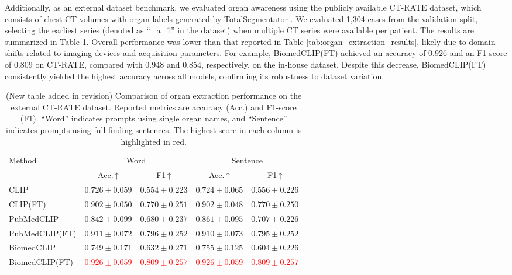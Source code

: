 \documentclass[bioengineering,article,submit,pdftex,moreauthors]{Definitions/mdpi}
\begin{document}
Additionally, as an external dataset benchmark, we evaluated organ awareness using the publicly available CT-RATE dataset, which consists of chest CT volumes with organ labels generated by TotalSegmentator \cite{hamamci_ct2rep_2024}. 
We evaluated 1,304 cases from the validation split, selecting the earliest series (denoted as “\_a\_1” in the dataset) when multiple CT series were available per patient. 
The results are summarized in Table \ref{tab:organ_extraction_results_ctrate}. 
Overall performance was lower than that reported in Table \ref{tab:organ_extraction_results}, likely due to domain shifts related to imaging devices and acquisition parameters. 
For example, BiomedCLIP(FT) achieved an accuracy of 0.926 and an F1-score of 0.809 on CT-RATE, compared with 0.948 and 0.854, respectively, on the in-house dataset. 
Despite this decrease, BiomedCLIP(FT) consistently yielded the highest accuracy across all models, confirming its robustness to dataset variation.



\begin{table}[ht]
  \centering
  \caption{(New table added in revision) Comparison of organ extraction performance on the external CT-RATE dataset. 
  Reported metrics are accuracy (Acc.) and F1-score (F1). 
  “Word” indicates prompts using single organ names, and “Sentence” indicates prompts using full finding sentences. 
  The highest score in each column is highlighted in red.}
  \label{tab:organ_extraction_results_ctrate}
  \begin{tabular}{lcccc}
    \toprule
    \multirow{2}{*}{Method} & \multicolumn{2}{c}{Word}               & \multicolumn{2}{c}{Sentence}           \\
    \cmidrule(lr){2-3}\cmidrule(lr){4-5}
                          & Acc.\,↑ & F1\,↑         & Acc.\,↑   & F1\,↑         \\ 
    \midrule
    CLIP                    & $0.726\pm0.059$ & $0.554\pm0.223$ & $0.724\pm0.065$ & $0.556\pm0.226$ \\
    CLIP(FT)                & $0.902\pm0.050$ & $0.770\pm0.251$ & $0.902\pm0.048$ & $0.770\pm0.250$ \\
    PubMedCLIP              & $0.842\pm0.099$ & $0.680\pm0.237$ & $0.861\pm0.095$ & $0.707\pm0.226$ \\
    PubMedCLIP(FT)          & $0.911\pm0.072$ & $0.796\pm0.252$ & $0.910\pm0.073$ & $0.795\pm0.252$ \\
    BiomedCLIP              & $0.749\pm0.171$ & $0.632\pm0.271$ & $0.755\pm0.125$ & $0.604\pm0.226$ \\
    BiomedCLIP(FT)          & \textcolor{red}{$0.926\pm0.059$} & \textcolor{red}{$0.809\pm0.257$} & \textcolor{red}{$0.926\pm0.059$} & \textcolor{red}{$0.809\pm0.257$} \\
    \bottomrule
  \end{tabular}
\end{table}
\end{document}
